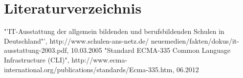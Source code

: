\documentclass[10pt,a4paper]{article}
\begin{document}
\section{Literaturverzeichnis}
\renewcommand{\section}[2]{}%
\begin{thebibliography}{xxxxxxxxxxxxx}
"'IT-Ausstattung der allgemein bildenden und berufsbildenden 
                         Schulen in Deutschland"', http://www.schulen-ans-netz.de/   
                         neuemedien/fakten/dokus/it-ausstattung-2003.pdf, 10.03.2005	
"Standard ECMA-335 Common Language Infrastructure (CLI)", http://www.ecma-international.org/publications/standards/Ecma-335.htm, 06.2012
\end{thebibliography}
\end{document}
